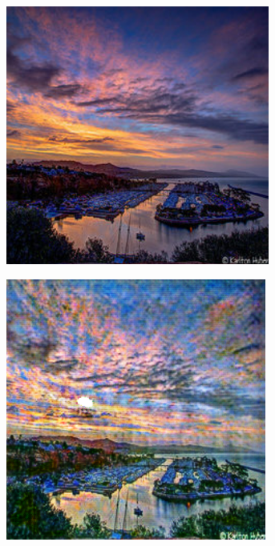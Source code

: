 \begin{figure}
\begin{subfigure}[t]{.14\textwidth}
  \end{subfigure}
  \hfill
  \begin{subfigure}[t]{.14\textwidth}
    \centering
    \includegraphics[width=\linewidth]{images/cycleGanResults/photo_input1.png}
  \end{subfigure}
  \begin{subfigure}[t]{.14\textwidth}
    \centering
    \includegraphics[width=\linewidth]{images/cycleGanResults/photo_output1.png}

\end{subfigure}
\end{figure}
